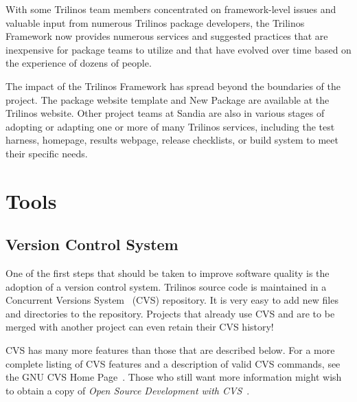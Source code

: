 \documentclass[12pt,relax]{article}
\begin{document}
  With some Trilinos team members concentrated on framework-level issues and
  valuable input from numerous Trilinos package developers, the Trilinos 
  Framework now provides numerous services and suggested practices that are
  inexpensive for package teams to utilize and that have evolved over 
  time based on the experience of dozens of people.

  The impact of the Trilinos Framework has spread beyond the boundaries of 
  the project.  The package website template and New Package are available 
  at the Trilinos website.  Other project teams at Sandia are also in various
  stages of adopting or adapting one or more of many Trilinos services, 
  including the test harness, homepage, results webpage, 
  release checklists, or build system to meet their specific needs. 


\clearpage


\section{Tools}
\label{Section:Tools}

\subsection{Version Control System}
One of the first steps that should be taken to improve software quality is the 
adoption of a version control system.  Trilinos source code is maintained in a 
Concurrent Versions System~\cite{CVS}
(CVS) repository.  It is very easy to add new files and directories to
the repository.  Projects that already use CVS and are to be merged with 
another project can even retain their CVS history!

CVS has many more features than those that are described below.  For a more 
complete listing of CVS features and a description of valid CVS commands, 
see the GNU CVS Home Page~\cite{CVS}.  Those who still want more information 
might wish to obtain a copy of 
{\it Open Source Development with CVS}~\cite{FogelBarCVS}.
\end{document}
